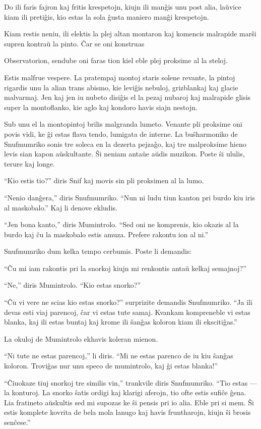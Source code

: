 Do ili faris fajron kaj fritis krespetojn, kiujn ili manĝis unu post alia, laŭvice kiam ili pretiĝis, kio estas la sola ĝusta maniero manĝi krespetojn.

Kiam restis neniu, ili elektis la plej altan montaron kaj komencis malrapide marŝi supren kontraŭ la pinto. Ĉar se oni konstruas

Observatorion, sendube oni faras tion kiel eble plej proksime al la steloj.

\sectionbreak

Estis malfrue vespere. La pratempaj montoj staris solene revante, la pintoj rigardis unu la alian trans abismo, kie leviĝis nebuloj, grizblankaj kaj glacie malvarmaj. Jen kaj jen iu nubeto disiĝis el la pezaj nubaroj kaj malrapide glisis super la montoflanko, kie aglo kaj kondoro havis siajn nestojn.

Sub unu el la montopintoj brilis malgranda lumeto. Venante pli proksime oni povis vidi, ke ĝi estas flava tendo, lumigata de interne. La buŝharmoniko de Snufmumriko sonis tre soleca en la dezerta pejzaĝo, kaj tre malproksime hieno levis sian kapon aŭskultante. Ŝi neniam antaŭe aŭdis muzikon. Poste ŝi ululis, terure kaj longe.

``Kio estis tio?'' diris Snif kaj movis sin pli proksimen al la lumo.

``Nenio danĝera,'' diris Snufmumriko. ``Nun ni ludu tiun kanton pri burdo kiu iris al maskobalo.'' Kaj li denove ekludis.

``Jen bona kanto,'' diris Mumintrolo. ``Sed oni ne komprenis, kio okazis al la burdo kaj ĉu la maskobalo estis amuza. Prefere rakontu ion al ni.''

Snufmumriko dum kelka tempo cerbumis. Poste li demandis:

``Ĉu mi iam rakontis pri la snorkoj kiujn mi renkontis antaŭ kelkaj semajnoj?''

``Ne,'' diris Mumintrolo. ``Kio estas snorko?''

``Ĉu vi vere ne scias kio estas snorko?'' surprizite demandis Snufmumriko. ``Ja ili devas esti viaj parencoj, ĉar vi estas tute samaj. Kvankam kompreneble vi estas blanka, kaj ili estas buntaj kaj krome ili ŝanĝas koloron kiam ili ekscitiĝas.''

La okuloj de Mumintrolo ekhavis koleran mienon.

``Ni tute ne estas parencoj,'' li diris. ``Mi ne estas parenco de iu kiu ŝanĝas koloron. Troviĝas nur unu speco de mumintrolo, kaj ĝi estas blanka!''

``Ĉiuokaze tiuj snorkoj tre similis vin,'' trankvile diris Snufmumriko. ``Tio estas --- la konturoj. La snorko ŝatis ordigi kaj klarigi aferojn, tio ofte estis sufiĉe ĝena. Lia fratineto aŭskultis sed mi supozas ke ŝi pensis pri io alia. Eble pri si mem. Ŝi estis komplete kovrita de bela mola lanugo kaj havis fruntharojn, kiujn ŝi brosis senĉese.''

